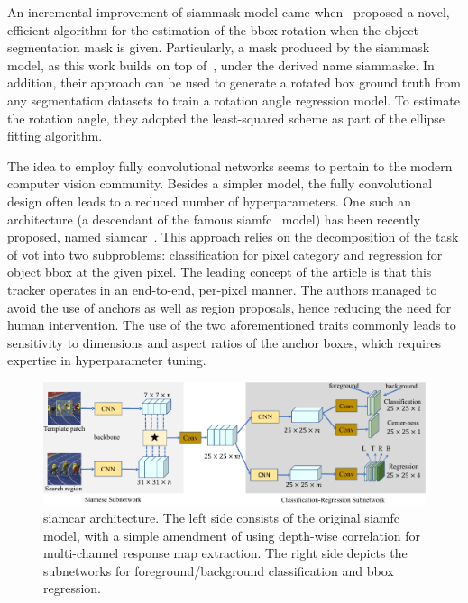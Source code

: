 An incremental improvement of \gls{siammask} model came when~\cite{chen2019rotbboxes} proposed a novel, efficient algorithm for the estimation of the \gls{bbox} rotation when the object segmentation mask is given. Particularly, a mask produced by the \gls{siammask} model, as this work builds on top of~\cite{wang2019siammask}, under the derived name \gls{siammaske}. In addition, their approach can be used to generate a rotated box ground truth from any segmentation datasets to train a rotation angle regression model. To estimate the rotation angle, they adopted the least-squared scheme as part of the ellipse fitting algorithm.

The idea to employ fully convolutional networks seems to pertain to the modern computer vision community. Besides a simpler model, the fully convolutional design often leads to a reduced number of hyperparameters. One such an architecture (a descendant of the famous \gls{siamfc}~\cite{bertinetto2016siamfc} model) has been recently proposed, named \gls{siamcar}~\cite{guo2019siamcar}. This approach relies on the decomposition of the task of \gls{vot} into two subproblems: classification for pixel category and regression for object \gls{bbox} at the given pixel. The leading concept of the article is that this tracker operates in an end-to-end, per-pixel manner. The authors managed to avoid the use of anchors as well as region proposals, hence reducing the need for human intervention. The use of the two aforementioned traits commonly leads to sensitivity to dimensions and aspect ratios of the anchor boxes, which requires expertise in hyperparameter tuning.

\begin{figure}[t]
    \centerline{\includegraphics[width=\linewidth]{figures/theoretical_foundations/siamcar_architecture.pdf}}
    \caption[\Gls{siamcar} architecture]{\Gls{siamcar} architecture. The left side consists of the original \gls{siamfc}~\cite{bertinetto2016siamfc} model, with a simple amendment of using depth-wise correlation for multi-channel response map extraction. The right side depicts the subnetworks for foreground/background classification and \gls{bbox} regression. }
    \label{fig:SiamCARArchitecture}
\end{figure}

